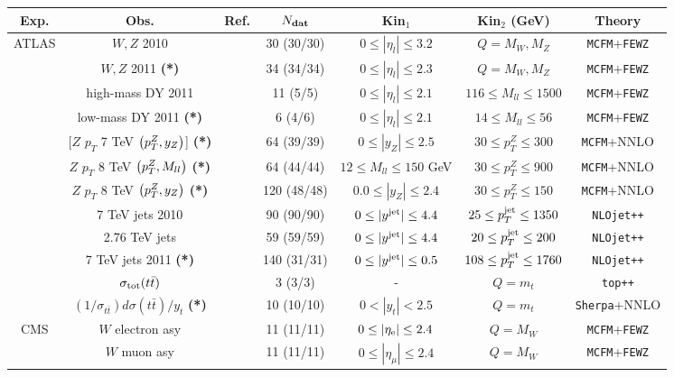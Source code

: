 \begin{table}[ht]
\scriptsize
\begin{centering}
   \renewcommand{\arraystretch}{1.4}
\begin{tabular}{|c|c|c|c|c|c|c|}
  \hline
  {Exp.} & Obs. & {Ref.}  & $ N_{\rm \bf dat}$  & Kin$_1$  &  Kin$_2$ (GeV) & Theory \tabularnewline
\hline
\hline
\multirow{12}{*}{ATLAS} &   $W,Z$ 2010 & \cite{Aad:2011dm}  &  30 (30/30) & $ 0 \le |\eta_l| \le 3.2$ & $Q=M_W, M_Z$ &
{\tt MCFM}+{\tt FEWZ}\tabularnewline
&   $W,Z$ 2011 {\bf (*)}  & \cite{Aaboud:2016btc}  & 34 (34/34)   & $0 \le |\eta_l| \le 2.3$   & $Q=M_W, M_Z$ &
{\tt MCFM}+{\tt FEWZ}\tabularnewline
&    high-mass DY 2011 & \cite{Aad:2013iua}  & 11 (5/5) & $0 \le |\eta_l| \le 2.1$ & $ 116 \le M_{ll} \le 1500$  &
{\tt MCFM}+{\tt FEWZ} \tabularnewline
&    low-mass DY 2011 {\bf (*)}   & \cite{Aad:2014qja}  & 6 (4/6)  & $0 \le  |\eta_l| \le 2.1$  & $  14 \le M_{ll} \le 56  $  &
{\tt MCFM}+{\tt FEWZ}
\tabularnewline
&    [$Z$ $p_T$ 7 TeV $\left( p_T^Z,y_Z\right)$]  {\bf (*)}  & \cite{Aad:2014xaa}  & 64 (39/39)  &
$0 \le |y_{Z}| \le 2.5$  &  $30 \le p_T^Z \le 300$   & {\tt MCFM}+NNLO
\tabularnewline
&    $Z$ $p_T$ 8 TeV $\left( p_T^Z,M_{ll}\right)$  {\bf (*)}  & \cite{Aad:2015auj}  & 64 (44/44)  &  $  12 \le M_{ll} \le
150 $  GeV & $30 \le p_T^Z \le 900$  & {\tt MCFM}+NNLO
      \tabularnewline
      &    $Z$ $p_T$ 8 TeV $\left( p_T^Z,y_Z\right)$  {\bf (*)}  & \cite{Aad:2015auj}  & 120 (48/48)  & $   0.0\le |y_{Z}| \le 2.4  $  
        & $   30\le p_{T}^Z \le 150  $  &
          {\tt MCFM}+NNLO
            \tabularnewline
&    7 TeV jets 2010 & \cite{Aad:2011fc}  & 90 (90/90) &
$0 \le |y^{\rm jet}| \le 4.4 $ & $ 25 \le p_T^{\rm jet} \le 1350 $&
{\tt NLOjet++}
\tabularnewline
&      2.76 TeV jets  &  \cite{Aad:2013lpa}  &
59 (59/59) & $0 \le |y^{\rm jet}| \le 4.4$ & $20 \le p_T^{\rm jet} \le 200$ & {\tt NLOjet++}
\tabularnewline
&      7 TeV jets 2011 {\bf (*)}  &  \cite{Aad:2014vwa}  & 140 (31/31)
  & $ 0 \le |y^{\rm jet}| \le 0.5  $ & $108 \le p_T^{\rm jet} \le 1760 $ & {\tt NLOjet++}
\tabularnewline
  &    $\sigma_{\rm tot}(t\bar{t})$  & \cite{Aad:2014kva,Aaboud:2016pbd}& 
3 (3/3) & - & $Q=m_t$ & {\tt top++} \tabularnewline
 &    $(1/\sigma_{t\bar{t}})d\sigma(t\bar{t})/y_t$  {\bf (*)}   & \cite{Aad:2015mbv}& 
10 (10/10)  & $0<|y_t|<2.5$ & $Q=m_t$ & {\tt Sherpa}+NNLO \tabularnewline
 \hline
 \hline
\multirow{12}{*}{CMS} &   $W$ electron asy & \cite{Chatrchyan:2012xt}  &  11 (11/11) &
$0 \le |\eta_{\rm e}| \le 2.4  $ & $Q=M_W$  & {\tt MCFM}+{\tt FEWZ} \tabularnewline
 &   $W$ muon asy  & \cite{Chatrchyan:2013mza}&   11 (11/11) & 
$0 \le |\eta_{\mu}| \le 2.4  $  & $Q=M_W$ & {\tt MCFM}+{\tt FEWZ} \tabularnewline

\end{tabular}
\end{centering}
\end{table}
